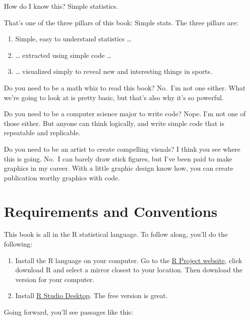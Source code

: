 \documentclass[]{book}
\providecommand{\tightlist}{%
  \setlength{\itemsep}{0pt}\setlength{\parskip}{0pt}}
\begin{document}
How do I know this? Simple statistics.

That's one of the three pillars of this book: Simple stats. The three pillars are:

\begin{enumerate}
\def\labelenumi{\arabic{enumi}.}
\tightlist
\item
  Simple, easy to understand statistics \ldots{}
\item
  \ldots{} extracted using simple code \ldots{}
\item
  \ldots{} visualized simply to reveal new and interesting things in sports.
\end{enumerate}

Do you need to be a math whiz to read this book? No.~I'm not one either. What we're going to look at is pretty basic, but that's also why it's so powerful.

Do you need to be a computer science major to write code? Nope. I'm not one of those either. But anyone can think logically, and write simple code that is repeatable and replicable.

Do you need to be an artist to create compelling visuals? I think you see where this is going. No.~I can barely draw stick figures, but I've been paid to make graphics in my career. With a little graphic design know how, you can create publication worthy graphics with code.

\hypertarget{requirements-and-conventions}{%
\section{Requirements and Conventions}\label{requirements-and-conventions}}

This book is all in the R statistical language. To follow along, you'll do the following:

\begin{enumerate}
\def\labelenumi{\arabic{enumi}.}
\item
  Install the R language on your computer. Go to the \href{https://www.r-project.org/}{R Project website}, click download R and select a mirror closest to your location. Then download the version for your computer.
\item
  Install \href{https://www.rstudio.com/products/rstudio/\#Desktop}{R Studio Desktop}. The free version is great.
\end{enumerate}

Going forward, you'll see passages like this:
\end{document}
